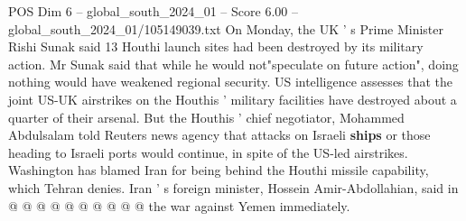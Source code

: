 \begin{textsample}{POS Dim 6 – global\_south\_2024\_01 – Score 6.00 – global\_south\_2024\_01/105149039.txt}
On Monday, the UK ' s Prime Minister Rishi Sunak said 13 Houthi launch sites had been destroyed by its military action.
Mr Sunak said that while he would not"speculate on future action", doing nothing would have weakened regional security.
US intelligence assesses that the joint US-UK airstrikes on the Houthis ' military facilities have destroyed about a quarter of their arsenal.
But the Houthis ' chief negotiator, Mohammed Abdulsalam told Reuters news agency that attacks on Israeli \textbf{ships} or those heading to Israeli ports would continue, in spite of the US-led airstrikes.
Washington has blamed Iran for being behind the Houthi missile capability, which Tehran denies.
Iran ' s foreign minister, Hossein Amir-Abdollahian, said in @ @ @ @ @ @ @ @ @ @ the war against Yemen immediately.

\end{textsample}
